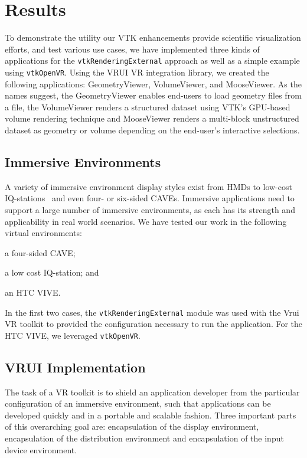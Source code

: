 \section{Results}

To demonstrate the utility our VTK enhancements provide scientific
visualization efforts, and test various use cases, we have implemented three kinds of
applications for the \texttt{vtkRenderingExternal} approach as well as
a simple example using \texttt{vtkOpenVR}.
Using the VRUI VR integration library, we created the following applications:
GeometryViewer, VolumeViewer, and MooseViewer.
As the names suggest, the GeometryViewer enables end-users to load geometry files from a file, the VolumeViewer renders a structured dataset using VTK's GPU-based volume rendering technique and MooseViewer renders a multi-block unstructured dataset as geometry or volume depending on the end-user's interactive selections.

\subsection{Immersive Environments}

A variety of immersive environment display styles exist from HMDs to low-cost IQ-stations~\cite{Sherman:2010} and even four- or six-sided CAVEs. Immersive applications need to support a large number of immersive environments, as each has its strength and applicability in real world scenarios. We have tested our work in the following virtual environments: 

\begin{compactitem}
\item a four-sided CAVE;
\item a low cost IQ-station; and 
\item an HTC VIVE.
\end{compactitem}

In the first two cases, the \texttt{vtkRenderingExternal} module was used with the Vrui VR toolkit to provided the configuration necessary to run the application. For the HTC VIVE, we leveraged \texttt{vtkOpenVR}. 

\subsection{VRUI Implementation}

The task of a VR toolkit is to shield an application developer from the particular configuration of an immersive environment, such that applications can be developed quickly and in a portable and scalable fashion. Three important parts of this overarching goal are: encapsulation of the display environment, encapsulation of the distribution environment and encapsulation of the input device environment.

